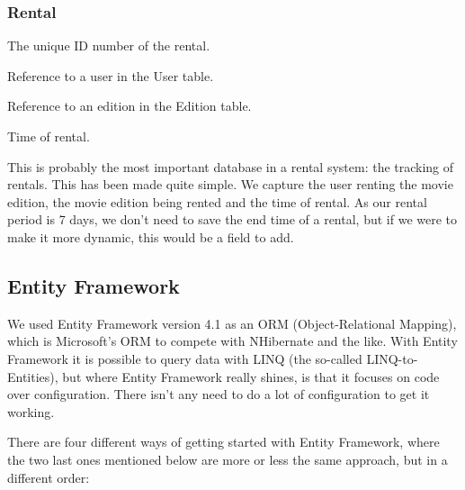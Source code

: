 \subsubsection{Rental}
\label{Design_Database_Tables_Rental}

\begin{my_description}
\item[rental\_id] The unique ID number of the rental.
\item[user\_id] Reference to a user in the User table.
\item[edition\_id] Reference to an edition in the Edition table.
\item[time] Time of rental.
\end{my_description}

This is probably the most important database in a rental system: the tracking of rentals. This has been made quite simple. We capture the user renting the movie edition, the movie edition being rented and the time of rental. As our rental period is 7 days, we don't need to save the end time of a rental, but if we were to make it more dynamic, this would be a field to add.

\subsection{Entity Framework}
\label{Design_Database_EntityFramework}

We used Entity Framework version 4.1 as an ORM (Object-Relational Mapping), which is Microsoft's ORM to compete with NHibernate and the like. With Entity Framework it is possible to query data with LINQ (the so-called LINQ-to-Entities), but where Entity Framework really shines, is that it focuses on code over configuration. There isn't any need to do a lot of configuration to get it working.

There are four different ways of getting started with Entity Framework, where the two last ones mentioned below are more or less the same approach, but in a different order:

